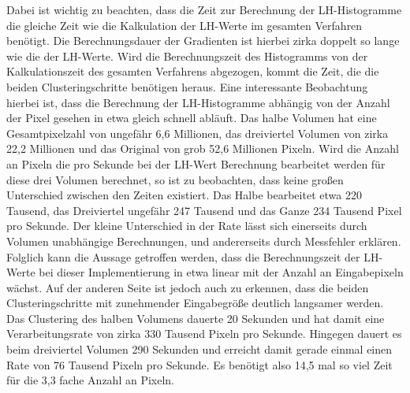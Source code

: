 Dabei ist wichtig zu beachten, dass die Zeit zur Berechnung der LH-Histogramme die gleiche Zeit wie die Kalkulation der LH-Werte im gesamten Verfahren benötigt. Die Berechnungsdauer der Gradienten ist hierbei zirka doppelt so lange wie die der LH-Werte. Wird die Berechnungszeit des Histogramms von der Kalkulationszeit des gesamten Verfahrens abgezogen, kommt die Zeit, die die beiden Clusteringschritte benötigen heraus.
\newline
Eine interessante Beobachtung hierbei ist, dass die Berechnung der LH-Histogramme abhängig von der Anzahl der Pixel gesehen in etwa gleich schnell abläuft. Das halbe Volumen hat eine Gesamtpixelzahl von ungefähr 6,6 Millionen, das dreiviertel Volumen von zirka 22,2 Millionen und das Original von grob 52,6 Millionen Pixeln. Wird die Anzahl an Pixeln die pro Sekunde bei der LH-Wert Berechnung bearbeitet werden für diese drei Volumen berechnet, so ist zu beobachten, dass keine großen Unterschied zwischen den Zeiten existiert. Das Halbe bearbeitet etwa 220 Tausend, das Dreiviertel ungefähr 247 Tausend und das Ganze 234 Tausend Pixel pro Sekunde. Der kleine Unterschied in der Rate lässt sich einerseits durch Volumen unabhängige Berechnungen, und andererseits durch Messfehler erklären. Folglich kann die Aussage getroffen werden, dass die Berechnungszeit der LH-Werte bei dieser Implementierung in etwa linear mit der Anzahl an Eingabepixeln wächst.
\newline
Auf der anderen Seite ist jedoch auch zu erkennen, dass die beiden Clusteringschritte mit zunehmender Eingabegröße deutlich langsamer werden. Das Clustering des halben Volumens dauerte 20 Sekunden und hat damit eine Verarbeitungsrate von zirka 330 Tausend Pixeln pro Sekunde. Hingegen dauert es beim dreiviertel Volumen 290 Sekunden und erreicht damit gerade einmal einen Rate von 76 Tausend Pixeln pro Sekunde. Es benötigt also 14,5 mal so viel Zeit für die 3,3 fache Anzahl an Pixeln.














































